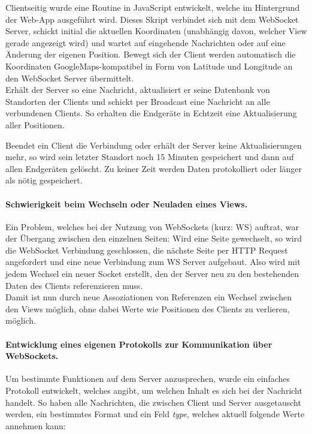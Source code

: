 Clientseitig wurde eine Routine in JavaScript entwickelt, welche im Hintergrund der Web-App ausgeführt wird. Dieses Skript verbindet sich mit dem WebSocket Server, schickt initial die aktuellen Koordinaten (unabhängig davon, welcher View gerade angezeigt wird) und wartet auf eingehende Nachrichten oder auf eine Änderung der eigenen Position. Bewegt sich der Client werden automatisch die Koordinaten GoogleMaps-kompatibel in Form von Latitude und Longitude an den WebSocket Server übermittelt.\\
Erhält der Server so eine Nachricht, aktualisiert er seine Datenbank von Standorten der Clients und schickt per Broadcast eine Nachricht an alle verbundenen Clients. So erhalten die Endgeräte in Echtzeit eine Aktualisierung aller Positionen.\par

Beendet ein Client die Verbindung oder erhält der Server keine Aktualisierungen mehr, so wird sein letzter Standort noch 15 Minuten gespeichert und dann auf allen Endgeräten gelöscht. Zu keiner Zeit werden Daten protokolliert oder länger als nötig gespeichert.\par

\paragraph{Schwierigkeit beim Wechseln oder Neuladen eines Views.}
Ein Problem, welches bei der Nutzung von WebSockets (kurz: WS) auftrat, war der Übergang zwischen den einzelnen Seiten: Wird eine Seite gewechselt, so wird die WebSocket Verbindung geschlossen, die nächste Seite per HTTP Request angefordert und eine neue Verbindung zum WS Server aufgebaut. Also wird mit jedem Wechsel ein neuer Socket erstellt, den der Server neu zu den bestehenden Daten des Clients referenzieren muss.\\
Damit ist nun durch neue Assoziationen von Referenzen ein Wechsel zwischen den Views möglich, ohne dabei Werte wie Positionen des Clients zu verlieren, möglich.

\paragraph{Entwicklung eines eigenen Protokolls zur Kommunikation über WebSockets.}
Um bestimmte Funktionen auf dem Server anzusprechen, wurde ein einfaches Protokoll entwickelt, welches angibt, um welchen Inhalt es sich bei der Nachricht handelt. So haben alle Nachrichten, die zwischen Client und Server ausgetauscht werden, ein bestimmtes Format und ein Feld \emph{type}, welches aktuell folgende Werte annehmen kann:

